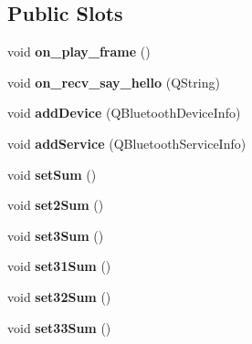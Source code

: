 \subsection*{Public Slots}
\begin{DoxyCompactItemize}
\item 
\mbox{\label{class_main_window_ab75863edb150d31aa07e183ad6b0db6a}} 
void {\bfseries on\+\_\+play\+\_\+frame} ()
\item 
\mbox{\label{class_main_window_a12a9db2a9c44cf17d575e8b541d7c987}} 
void {\bfseries on\+\_\+recv\+\_\+say\+\_\+hello} (Q\+String)
\item 
\mbox{\label{class_main_window_aece686f24ed6e728cecf951cbbbb6047}} 
void {\bfseries add\+Device} (Q\+Bluetooth\+Device\+Info)
\item 
\mbox{\label{class_main_window_afee09d84cc37bf2087467a40d0d1fee1}} 
void {\bfseries add\+Service} (Q\+Bluetooth\+Service\+Info)
\item 
\mbox{\label{class_main_window_ad9ca0c094dac9c5ff660c350cbd805ff}} 
void {\bfseries set\+Sum} ()
\item 
\mbox{\label{class_main_window_acfa837994770439b83e031f2e8db69ff}} 
void {\bfseries set2\+Sum} ()
\item 
\mbox{\label{class_main_window_aec0cc61e7aee90b76ae067043aac0904}} 
void {\bfseries set3\+Sum} ()
\item 
\mbox{\label{class_main_window_a299592b80aeb236d716d7cd70d52631c}} 
void {\bfseries set31\+Sum} ()
\item 
\mbox{\label{class_main_window_aa5a023636aaecd04fe4ee706ad1edf04}} 
void {\bfseries set32\+Sum} ()
\item 
\mbox{\label{class_main_window_aaafb8622d3f967cc32fd43b25ee109c5}} 
void {\bfseries set33\+Sum} ()
\item 
\mbox{\label{class_main_window_a2197cad6682811aa0ed2820b7601a006}} 

\end{DoxyCompactItemize}
